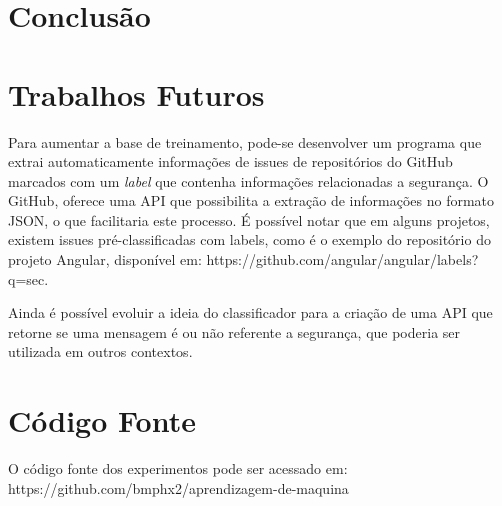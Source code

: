 \documentclass[conference]{IEEEtran}
\begin{document}
\section{Conclusão}

\section{Trabalhos Futuros}

Para aumentar a base de treinamento, pode-se desenvolver um programa que extrai automaticamente informações de issues de repositórios do GitHub marcados com um \textit{label} que contenha informações relacionadas a segurança. O GitHub, oferece uma API que possibilita a extração de informações no formato JSON, o que facilitaria este processo. É possível notar que em alguns projetos, existem issues pré-classificadas com labels, como é o exemplo do repositório do projeto Angular, disponível em: https://github.com/angular/angular/labels?q=sec.

Ainda é possível evoluir a ideia do classificador para a criação de uma API que retorne se uma mensagem é ou não referente a segurança, que poderia ser utilizada em outros contextos.

\section{Código Fonte}

O código fonte dos experimentos pode ser acessado em: https://github.com/bmphx2/aprendizagem-de-maquina



\end{document}
